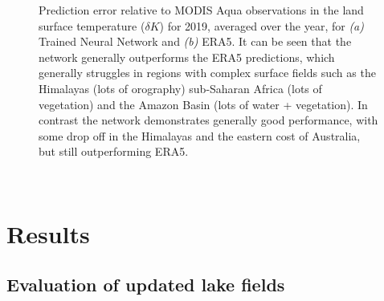 \documentclass[hess, manuscript]{copernicus}
\begin{document}
\begin{figure}
	 \hspace{1mm}
	\caption{Prediction error relative to MODIS Aqua observations in the land surface temperature  ($\delta K$) for 2019, averaged over the year, for \textit{(a)} Trained Neural Network and \textit{(b) }ERA5. It can be seen that the network generally outperforms the ERA5 predictions, which generally struggles in regions with complex surface fields such as the Himalayas (lots of orography) sub-Saharan Africa (lots of vegetation) and the Amazon Basin (lots of water + vegetation). In contrast the network demonstrates generally good performance, with some drop off in the Himalayas and the eastern cost of Australia, but still outperforming ERA5.} 
	\label{fig:example_model}
\end{figure}


\clearpage
\newpage
\mbox{~}

\section{Results}

\subsection{Evaluation of updated lake fields}\label{sec:3}
\end{document}
